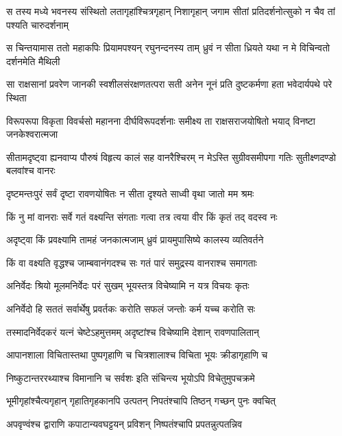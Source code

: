 
\twolineshloka
{स तस्य मध्ये भवनस्य संस्थितो लतागृहांश्चित्रगृहान् निशागृहान्}
{जगाम सीतां प्रतिदर्शनोत्सुको न चैव तां पश्यति चारुदर्शनाम्} %

\twolineshloka
{स चिन्तयामास ततो महाकपिः प्रियामपश्यन् रघुनन्दनस्य ताम्}
{ध्रुवं न सीता ध्रियते यथा न मे विचिन्वतो दर्शनमेति मैथिली} %

\twolineshloka
{सा राक्षसानां प्रवरेण जानकी स्वशीलसंरक्षणतत्परा सती}
{अनेन नूनं प्रति दुष्टकर्मणा हता भवेदार्यपथे परे स्थिता} %

\twolineshloka
{विरूपरूपा विकृता विवर्चसो महानना दीर्घविरूपदर्शनाः}
{समीक्ष्य ता राक्षसराजयोषितो भयाद् विनष्टा जनकेश्वरात्मजा} %

\twolineshloka
{सीतामदृष्ट्वा ह्यनवाप्य पौरुषं विहृत्य कालं सह वानरैश्चिरम्}
{न मेऽस्ति सुग्रीवसमीपगा गतिः सुतीक्ष्णदण्डो बलवांश्च वानरः} %

\twolineshloka
{दृष्टमन्तःपुरं सर्वं दृष्टा रावणयोषितः}
{न सीता दृश्यते साध्वी वृथा जातो मम श्रमः} %

\twolineshloka
{किं नु मां वानराः सर्वे गतं वक्ष्यन्ति संगताः}
{गत्वा तत्र त्वया वीर किं कृतं तद् वदस्व नः} %

\twolineshloka
{अदृष्ट्वा किं प्रवक्ष्यामि तामहं जनकात्मजाम्}
{ध्रुवं प्रायमुपासिष्ये कालस्य व्यतिवर्तने} %

\twolineshloka
{किं वा वक्ष्यति वृद्धश्च जाम्बवानंगदश्च सः}
{गतं पारं समुद्रस्य वानराश्च समागताः} %

\twolineshloka
{अनिर्वेदः श्रियो मूलमनिर्वेदः परं सुखम्}
{भूयस्तत्र विचेष्यामि न यत्र विचयः कृतः} %

\twolineshloka
{अनिर्वेदो हि सततं सर्वार्थेषु प्रवर्तकः}
{करोति सफलं जन्तोः कर्म यच्च करोति सः} %

\twolineshloka
{तस्मादनिर्वेदकरं यत्नं चेष्टेऽहमुत्तमम्}
{अदृष्टांश्च विचेष्यामि देशान् रावणपालितान्} %

\twolineshloka
{आपानशाला विचितास्तथा पुष्पगृहाणि च}
{चित्रशालाश्च विचिता भूयः क्रीडागृहाणि च} %

\twolineshloka
{निष्कुटान्तररथ्याश्च विमानानि च सर्वशः}
{इति संचिन्त्य भूयोऽपि विचेतुमुपचक्रमे} %

\twolineshloka
{भूमीगृहांश्चैत्यगृहान् गृहातिगृहकानपि}
{उत्पतन् निपतंश्चापि तिष्ठन् गच्छन् पुनः क्वचित्} %

\twolineshloka
{अपवृण्वंश्च द्वाराणि कपाटान्यवघट्टयन्}
{प्रविशन् निष्पतंश्चापि प्रपतन्नुत्पतन्निव} %

